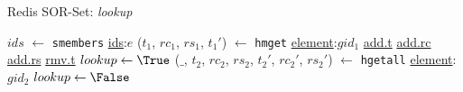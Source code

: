 \begin{algorithm}[t]
\small{
	\caption{Redis SOR-Set: \textit{lookup}}
 	\label{alg:lookup}
 	\begin{algorithmic}[1]
 	    \State $ids$ $\gets$ \texttt{smembers} \underline{ids}:$e$
 	        \State ($t_{1}$, $rc_{1}$, $rs_{1}$, $t_{1}'$) $\gets$
 	        \Statex\hspace{\algorithmicindent}\hspace{\algorithmicindent}\hspace{\algorithmicindent}\hspace{\algorithmicindent} \texttt{hmget} \underline{element}:$gid_{1}$ \underline{add.t} \underline{add.rc} \underline{add.rs} \underline{rmv.t}
 	          \State $lookup \gets \True$
 	              \State ($\_$, $t_{2}$, $rc_{2}$, $rs_{2}$, $t_{2}'$, $rc_{2}'$, $rs_{2}'$) $\gets$
 	              \Statex\hspace{\algorithmicindent}\hspace{\algorithmicindent}\hspace{\algorithmicindent}\hspace{\algorithmicindent}\hspace{\algorithmicindent}\hspace{\algorithmicindent}\hspace{\algorithmicindent} \texttt{hgetall} \underline{element}:$gid_{2}$
 	                \State $lookup \gets \False$
 	                \State \Break
 	              \EndIf
 	            \EndIf
 	          \EndFor
 	            \State \Return \True
 	          \EndIf
 	        \EndIf
 	      \EndIf
 	    \EndFor
 	    \State \Return \False
 	  \EndFunction
	\end{algorithmic}
 }
\end{algorithm}

